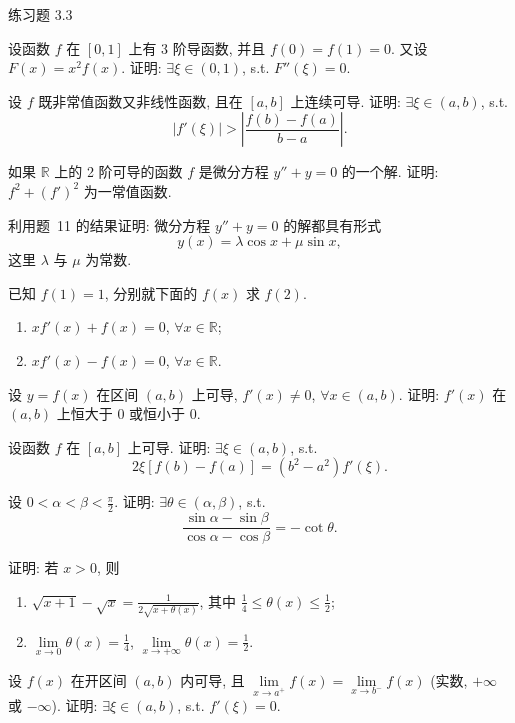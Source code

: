 \begin{exblock}{练习题 3.3}
  \item 设函数 $f$ 在 $[0,1]$ 上有 3 阶导函数, 并且 $f(0)=f(1)=0$. 又设 $F(x)=x^{2}f(x)$. 证明: $\exists\xi\in(0,1)$, s.t. $F''(\xi)=0$.

  \item 设 $f$ 既非常值函数又非线性函数, 且在 $[a,b]$ 上连续可导. 证明: $\exists\xi\in(a,b)$, s.t.
  \[
  |f'(\xi)|>\left|\frac{f(b)-f(a)}{b-a}\right|.
\]

  \item 如果 $\mathbb{R}$ 上的 2 阶可导的函数 $f$ 是微分方程 $y''+y=0$ 的一个解. 证明: $f^{2}+(f')^{2}$ 为一常值函数.

  \item 利用题~11 的结果证明: 微分方程 $y''+y=0$ 的解都具有形式
  \[
  y(x)=\lambda\cos x+\mu\sin x,
\]
  这里 $\lambda$ 与 $\mu$ 为常数.

  \item 已知 $f(1)=1$, 分别就下面的 $f(x)$ 求 $f(2)$.
  \begin{enumerate}[label=(\arabic*)]
    \item $xf'(x)+f(x)=0$, $\forall x\in\mathbb{R}$;
    \item $xf'(x)-f(x)=0$, $\forall x\in\mathbb{R}$.
  \end{enumerate}

  \item 设 $y=f(x)$ 在区间 $(a,b)$ 上可导, $f'(x)\neq0$, $\forall x\in(a,b)$. 证明: $f'(x)$ 在 $(a,b)$ 上恒大于 $0$ 或恒小于 $0$.

  \item 设函数 $f$ 在 $[a,b]$ 上可导. 证明: $\exists\xi\in(a,b)$, s.t.
  \[
  2\xi[f(b)-f(a)]=(b^{2}-a^{2})f'(\xi).
\]

  \item 设 $0<\alpha<\beta<\frac{\pi}{2}$. 证明: $\exists\theta\in(\alpha,\beta)$, s.t.
  \[
  \frac{\sin\alpha-\sin\beta}{\cos\alpha-\cos\beta}=-\cot\theta.
\]

  \item 证明: 若 $x>0$, 则
  \begin{enumerate}[label=(\arabic*)]
    \item $\sqrt{x+1}-\sqrt{x}=\frac{1}{2\sqrt{x+\theta(x)}}$, 其中 $\frac{1}{4}\leqslant\theta(x)\leqslant\frac{1}{2}$;
    \item $\lim\limits_{x\to0}\theta(x)=\frac{1}{4}$, $\lim\limits_{x\to+\infty}\theta(x)=\frac{1}{2}$.
  \end{enumerate}

  \item 设 $f(x)$ 在开区间 $(a,b)$ 内可导, 且 $\lim\limits_{x\to a^+}f(x)=\lim\limits_{x\to b^-}f(x)$ (实数, $+\infty$ 或 $-\infty$). 证明: $\exists\xi\in(a,b)$, s.t. $f'(\xi)=0$.


\end{exblock}
